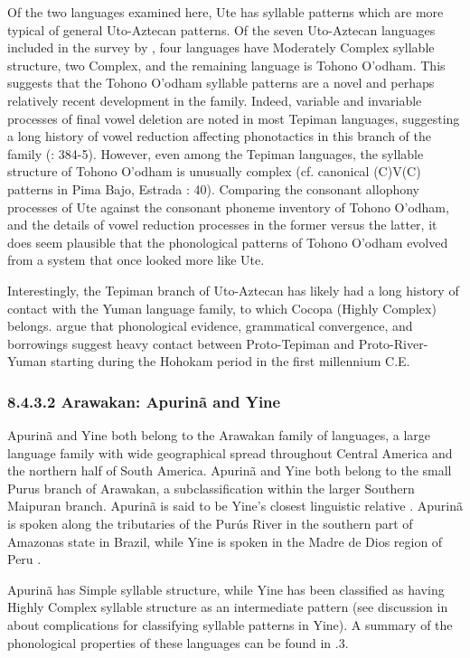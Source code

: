   Of the two languages examined here, Ute has syllable patterns which are more typical of general Uto-Aztecan patterns. Of the seven Uto-Aztecan languages included in the survey by \citet{Maddieson2013a}, four languages have Moderately Complex syllable structure, two Complex, and the remaining language is Tohono O’odham. This suggests that the Tohono O’odham syllable patterns are a novel and perhaps relatively recent development in the family. Indeed, variable and invariable processes of final vowel deletion are noted in most Tepiman languages, suggesting a long history of vowel reduction affecting phonotactics in this branch of the family (\citealt{ShaulHill1998}: 384-5). However, even among the Tepiman languages, the syllable structure of Tohono O’odham is unusually complex (cf. canonical (C)V(C) patterns in Pima Bajo, Estrada \citealt{Fernández2014}: 40). Comparing the consonant allophony processes of Ute against the consonant phoneme inventory of Tohono O’odham, and the details of vowel reduction processes in the former versus the latter, it does seem plausible that the phonological patterns of Tohono O’odham evolved from a system that once looked more like Ute.

  Interestingly, the Tepiman branch of Uto-Aztecan has likely had a long history of contact with the Yuman language family, to which Cocopa (Highly Complex) belongs. \citet{ShaulHill1998} argue that phonological evidence, grammatical convergence, and borrowings suggest heavy contact between Proto-Tepiman and Proto-River-Yuman starting during the Hohokam period in the first millennium C.E.

\subsubsection{\textbf{8.4.3.2} \textbf{Arawakan:} \textbf{Apurinã} \textbf{and} \textbf{Yine}}

  Apurinã and Yine both belong to the Arawakan family of languages, a large language family with wide geographical spread throughout Central America and the northern half of South America. Apurinã and Yine both belong to the small Purus branch of Arawakan, a subclassification within the larger Southern Maipuran branch. Apurinã is said to be Yine’s closest linguistic relative \citep{Facundes2002}. Apurinã is spoken along the tributaries of the Purús River in the southern part of Amazonas state in Brazil, while Yine is spoken in the Madre de Dios region of Peru \citep{Aikhenvald1999}.

  Apurinã has Simple syllable structure, while Yine has been classified as having Highly Complex syllable structure as an intermediate pattern (see discussion in  about complications for classifying syllable patterns in Yine). A summary of the phonological properties of these languages can be found in .3.

